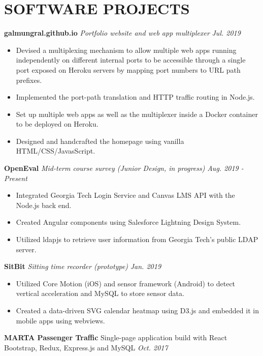\documentclass[11pt]{article}
\begin{document}
\section*{SOFTWARE PROJECTS}
\textbf{galmungral.github.io}  \enspace \textit{\color{gray} Portfolio website and web app multiplexer} \hfill\textit{Jul. 2019}
\begin{itemize}[leftmargin=15pt, noitemsep, topsep=0pt]
\item Devised a multiplexing mechanism to allow multiple web apps running independently on different internal ports to be accessible through a single port exposed on Heroku servers by mapping port numbers to URL path prefixes.
\item Implemented the port-path translation and HTTP traffic routing in Node.js.
\item Set up multiple web apps as well as the multiplexer inside a Docker container to be deployed on Heroku.
\item Designed and handcrafted the homepage using vanilla HTML/CSS/JavasScript.
\end{itemize}
\vspace{0.5em}
%
\textbf{OpenEval} \enspace \textit{\color{gray} Mid-term course survey (Junior Design, in progress)} \hfill \textit{Aug. 2019 - Present}
\begin{itemize}[leftmargin=15pt, noitemsep, topsep=0pt]
\item Integrated Georgia Tech Login Service and Canvas LMS API with the Node.js back end.
\item Created Angular components using Salesforce Lightning Design System.
\item Utilized ldapjs to retrieve user information from Georgia Tech's public LDAP server.
\end{itemize}
\vspace{0.5em}
%
\textbf{SitBit} \enspace \textit{\color{gray} Sitting time recorder (prototype)}  \hfill \textit{Jan. 2019}
\begin{itemize}[leftmargin=15pt, noitemsep, topsep=0pt]
\item Utilized Core Motion (iOS) and sensor framework (Android) to detect vertical acceleration and MySQL to store sensor data.
\item Created a data-driven SVG calendar heatmap using D3.js and embedded it in mobile apps using webviews.
\end{itemize}
\vspace{0.5em}
%
\textbf{MARTA Passenger Traffic} \enspace Single-page application build with React Bootstrap, Redux, Express.js and MySQL \hfill\textit{Oct. 2017}\\
\end{document}
